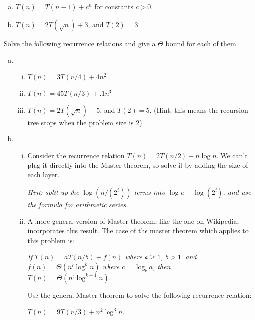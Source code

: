 \begin{qunlist}
\begin{enumerate}[(a)]
\item $T(n) = T(n-1) + c^n$ for constants $c>0$.

\answer{}

\item $T(n) = 2T(\sqrt{n}) + 3$, and $T(2) = 3$.

\answer{}
 
\end{enumerate}



Solve the following recurrence relations and give a $\Theta$ bound for each of them.
\begin{enumerate}[(a)]
\item
\begin{enumerate}[(i)]
\item
$T(n) = 3T(n/4) + 4n^2$
\item $T(n) = 45T(n/3) + .1n^3$
\item $T(n) = 2T(\sqrt{n}) + 5$, and $T(2) = 5$. (Hint: this means the recursion tree stops when the problem size is $2$)
\end{enumerate}
\item
\begin{enumerate}[(i)]
\item Consider the recurrence relation $T(n) = 2T(n/2) + n \log n$. We can't plug it directly into the Master theorem, so solve it by adding the size of each layer.

\textit{Hint: split up the $\log (n/(2^i))$ terms into $\log n - \log (2^i)$, and use the formula for arithmetic series.}

\item A more general version of Master theorem, like the one on \href{https://en.wikipedia.org/wiki/Master_theorem}{Wikipedia}, incorporates this result. The case of the master theorem which applies to this problem is:

\textit{If $T(n) = aT(n/b) + f(n)$ where $a \geq 1$, $b > 1$, and $f(n) = \Theta(n^c \log^k n)$ where $c = \log_b a$, then $T(n) = \Theta(n^c \log^{k+1} n)$. }

Use the general Master theorem to solve the following recurrence relation:

$T(n) = 9T(n/3) + n^2 \log ^3 n$.
\end{enumerate} 
\end{enumerate}

\answer{}



\end{qunlist}
